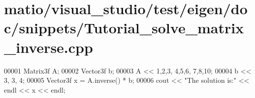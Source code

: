 \hypertarget{matio_2visual__studio_2test_2eigen_2doc_2snippets_2_tutorial__solve__matrix__inverse_8cpp_source}{}\section{matio/visual\+\_\+studio/test/eigen/doc/snippets/\+Tutorial\+\_\+solve\+\_\+matrix\+\_\+inverse.cpp}
\label{matio_2visual__studio_2test_2eigen_2doc_2snippets_2_tutorial__solve__matrix__inverse_8cpp_source}

\begin{DoxyCode}
00001 Matrix3f A;
00002 Vector3f b;
00003 A << 1,2,3,  4,5,6,  7,8,10;
00004 b << 3, 3, 4;
00005 Vector3f x = A.inverse() * b;
00006 cout << \textcolor{stringliteral}{"The solution is:"} << endl << x << endl;
\end{DoxyCode}

